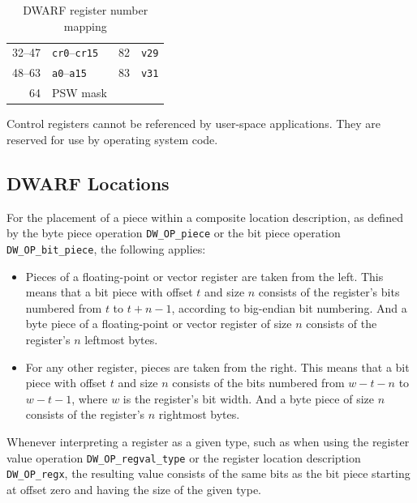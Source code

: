 \documentclass[USenglish,fontsize=11pt,twoside,%
  toc=bib,toc=idx,toc=graduated,numbers=noendperiod,
  bookmarks=true,
  bookmarksnumbered=true,
  bookmarksopen=true,
  bookmarksopenlevel=1,
  breaklinks=true,
  colorlinks=true,
  linkcolor=black,
  pdfpagelayout={TwoPageRight},
  pdfusetitle=true
]{scrreprt}
\newenvironment{DIFnomarkup}{}{} %
\begin{document}
\begin{table}
\begin{DIFnomarkup}
\begin{threeparttable}
\begin{tabular}[t]{rl!{\qquad}rl}
      32--47 & \texttt{cr0}--\texttt{cr15}\tnote{\dagger}
                        & 82 & \texttt{v29} \\
      48--63 & \texttt{a0}--\texttt{a15}
                        & 83 & \texttt{v31} \\
      64 & PSW mask \\
      \bottomrule
    \end{tabular}
    \medskip
    \begin{tablenotes}
    \item [\dagger] Control registers cannot be referenced by user-space
      applications.  They are reserved for use by operating system code.
    \end{tablenotes}
  \end{threeparttable}
  \end{DIFnomarkup}
  \caption{DWARF register number mapping}
  \label{tab:dwarfreg}
\end{table}

\subsection{DWARF Locations}
For the placement of a piece within a composite location description, as
defined by the byte piece operation \texttt{DW\_OP\_piece} or the bit
piece operation \texttt{DW\_OP\_bit\_piece}, the following applies:
\begin{itemize}
\item Pieces of a floating-point or vector register are taken from the
  left.  This means that a bit piece with offset $t$ and size $n$
  consists of the register's bits numbered from $t$ to $t+n-1$,
  according to big-endian bit numbering.  And a byte piece of a
  floating-point or vector register of size $n$ consists of the
  register's $n$ leftmost bytes.
\item For any other register, pieces are taken from the right.  This means
  that a bit piece with offset $t$ and size $n$ consists of the bits
  numbered from $w-t-n$ to $w-t-1$, where $w$ is the register's bit
  width.  And a byte piece of size $n$ consists of the register's $n$
  rightmost bytes.
\end{itemize}

Whenever interpreting a register as a given type, such as when using the
register value operation \texttt{DW\_OP\_regval\_type} or the register
location description \texttt{DW\_OP\_regx}, the resulting value consists
of the same bits as the bit piece starting at offset zero and having the
size of the given type.
\end{document}
